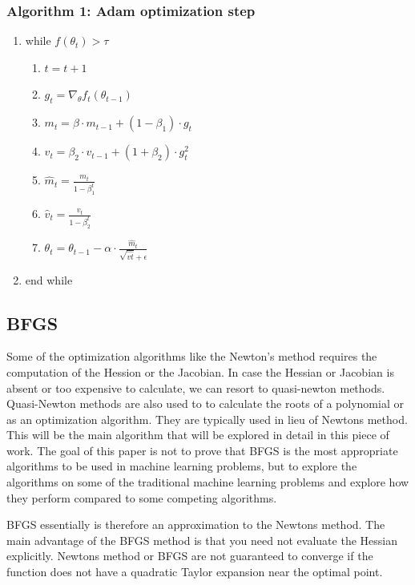 \documentclass[10pt,twocolumn]{article}
\begin{document}
\subsubsection{Algorithm 1: Adam optimization step}
\begin{enumerate}
\item while  $ f ( \theta_t ) > \tau $ 
	\begin{enumerate}
	\item$ t = t + 1 $
	\item$g_t = \nabla_{\theta} f_t (\theta_{t-1})$
	\item$ m_t = \beta \cdot m_{t-1} + (1-\beta_1) \cdot g_t  $
	\item$ v_t = \beta_2 \cdot v_{t-1} + (1+\beta_2) \cdot g_t^2  $
	\item$\hat{m}_t =\frac{m_t}{1-\beta_1^t}  $
	\item$\hat{v}_t = \frac{v_t}{1-\beta_2^t}  $
	\item$ \theta_t = \theta_{t-1} - \alpha \cdot  \frac{{\hat{m}_t}}{\sqrt{\hat{vt}} + \epsilon} $
	\end{enumerate}
\item end while
\end{enumerate}

\subsection{BFGS}
Some of the optimization algorithms like the Newton's method requires the computation of the Hession or the Jacobian. In case the Hessian or Jacobian is absent or too expensive to calculate, we can resort to quasi-newton methods. Quasi-Newton methods are also used to to calculate the roots of a polynomial or as an optimization algorithm. They are typically used in lieu of Newtons method. This will be the main algorithm that will be explored in detail in this piece of work. The goal of this paper is not to prove that BFGS is the most appropriate algorithms to be used in machine learning problems, but to explore the algorithms on some of the traditional machine learning problems and explore how they perform compared to some competing algorithms. 

BFGS essentially is therefore an approximation to the Newtons method. The main advantage of the BFGS method is that you need not evaluate the Hessian explicitly. Newtons method or BFGS are not guaranteed to converge if the function does not have a quadratic Taylor expansion near the optimal point.
\end{document}
